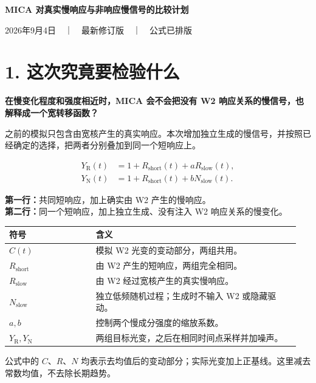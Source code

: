 \documentclass[11pt,a4paper]{article}
\begin{document}
{\Large\bfseries MICA {\zhfont 对真实慢响应与非响应慢信号的比较计划}}

{\small 2026{\zhfont 年}9{\zhfont 月}4{\zhfont 日　｜　最新修订版　｜　公式已排版}}

\section*{1. {\zhfont 这次究竟要检验什么}}

\textbf{{\zhfont 在慢变化程度和强度相近时，}MICA {\zhfont 会不会把没有} W2 {\zhfont 响应关系的慢信号，也解释成一个宽转移函数？}}

{\zhfont 之前的模拟只包含由宽核产生的真实响应。本次增加独立生成的慢信号，并按照已经确定的选择，把两者分别叠加到同一个短响应上。}

\begin{align}
Y_{\mathrm{R}}(t) &= 1+R_{\mathrm{short}}(t)+aR_{\mathrm{slow}}(t),\\
Y_{\mathrm{N}}(t) &= 1+R_{\mathrm{short}}(t)+bN_{\mathrm{slow}}(t).
\end{align}

\textbf{{\zhfont 第一行：}}{\zhfont 共同短响应，加上确实由} W2 {\zhfont 产生的慢响应。}\\
\textbf{{\zhfont 第二行：}}{\zhfont 同一个短响应，加上独立生成、没有注入} W2 {\zhfont 响应关系的慢变化。}

\begin{tabular}{@{}p{0.29\linewidth}p{0.66\linewidth}@{}}
\toprule
{\zhfont 符号} & {\zhfont 含义}\\
\midrule
$C(t)$ & {\zhfont 模拟} W2 {\zhfont 光变的变动部分，两组共用。}\\
$R_{\mathrm{short}}$ & {\zhfont 由} W2 {\zhfont 产生的短响应，两组完全相同。}\\
$R_{\mathrm{slow}}$ & {\zhfont 由} W2 {\zhfont 经过宽核产生的真实慢响应。}\\
$N_{\mathrm{slow}}$ & {\zhfont 独立低频随机过程；生成时不输入} W2 {\zhfont 或隐藏驱动。}\\
$a,b$ & {\zhfont 控制两个慢成分强度的缩放系数。}\\
$Y_{\mathrm{R}},Y_{\mathrm{N}}$ & {\zhfont 两组目标光变，之后在相同时间点采样并加噪声。}\\
\bottomrule
\end{tabular}

{\zhfont 公式中的} $C${\zhfont 、}$R${\zhfont 、}$N$ {\zhfont 均表示去均值后的变动部分；实际光变加上正基线。这里减去常数均值，不去除长期趋势。}
\end{document}

